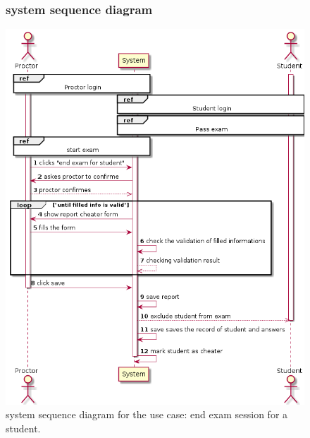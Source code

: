 \documentclass[]{uc2pfecaneva}
\begin{document}
    \begin{figure}[h]
        \subsubsection{system sequence diagram}
        \centering
        \includegraphics[width=\textwidth]{images/End_exam_for_student}

        \caption{system sequence diagram for the use case: end exam session for a student.}
    \end{figure}
    \clearpage
\end{document}

